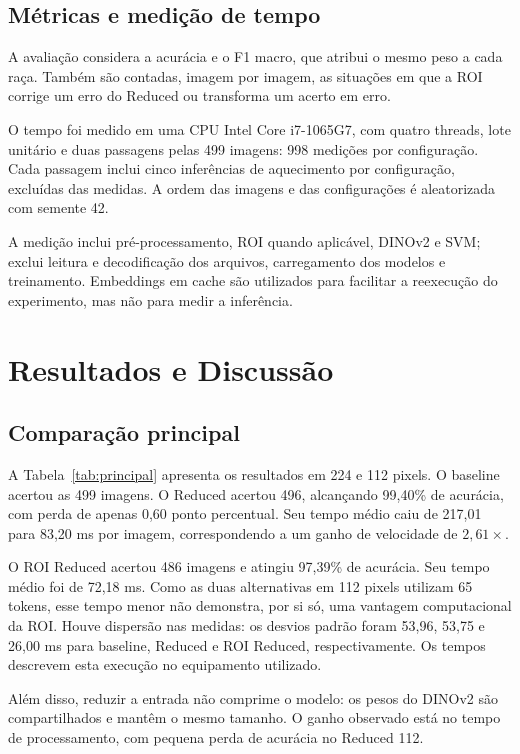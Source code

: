 \documentclass[conference]{IEEEtran}
\begin{document}
\subsection{Métricas e medição de tempo}
A avaliação considera a acurácia e o F1 macro, que atribui o mesmo
peso a cada raça. Também são contadas, imagem por imagem, as situações
em que a ROI corrige um erro do Reduced ou transforma um acerto em erro.

O tempo foi medido em uma CPU Intel Core i7-1065G7, com quatro threads,
lote unitário e duas passagens pelas 499 imagens: 998 medições por
configuração. Cada passagem inclui cinco inferências de aquecimento
por configuração, excluídas das medidas. A ordem das imagens e das
configurações é aleatorizada com semente 42.

A medição inclui pré-processamento, ROI quando aplicável, DINOv2 e SVM;
exclui leitura e decodificação dos arquivos, carregamento dos modelos
e treinamento. Embeddings em cache são utilizados para facilitar a
reexecução do experimento, mas não para medir a inferência.

\section{Resultados e Discussão}
\subsection{Comparação principal}
A Tabela~\ref{tab:principal} apresenta os resultados em 224 e 112 pixels.
O baseline acertou as 499 imagens. O Reduced acertou 496, alcançando
99,40\% de acurácia, com perda de apenas 0,60 ponto percentual.
Seu tempo médio caiu de 217,01 para 83,20 ms por imagem, correspondendo
a um ganho de velocidade de $2{,}61\times$.

O ROI Reduced acertou 486 imagens e atingiu 97,39\% de acurácia.
Seu tempo médio foi de 72,18 ms. Como as duas alternativas em 112 pixels
utilizam 65 tokens, esse tempo menor não demonstra, por si só, uma
vantagem computacional da ROI. Houve dispersão nas medidas: os desvios
padrão foram 53,96, 53,75 e 26,00 ms para baseline, Reduced e ROI Reduced,
respectivamente. Os tempos descrevem esta execução no equipamento utilizado.

Além disso, reduzir a entrada não comprime o modelo: os pesos do DINOv2
são compartilhados e mantêm o mesmo tamanho. O ganho observado está
no tempo de processamento, com pequena perda de acurácia no Reduced 112.
\end{document}
